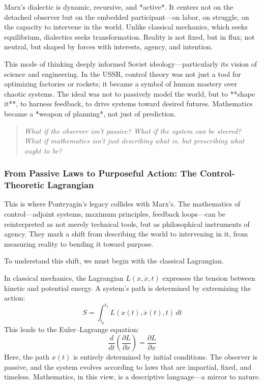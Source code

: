 Marx's dialectic is dynamic, recursive, and *active*. It centers not on the detached observer but on the embedded participant—on labor, on struggle, on the capacity to intervene in the world. Unlike classical mechanics, which seeks equilibrium, dialectics seeks transformation. Reality is not fixed, but in flux; not neutral, but shaped by forces with interests, agency, and intention.

This mode of thinking deeply informed Soviet ideology—particularly its vision of science and engineering. In the USSR, control theory was not just a tool for optimizing factories or rockets; it became a symbol of human mastery over chaotic systems. The ideal was not to passively model the world, but to **shape it**, to harness feedback, to drive systems toward desired futures. Mathematics became a *weapon of planning*, not just of prediction.

\begin{quote}
\emph{What if the observer isn’t passive? What if the system can be steered? What if mathematics isn't just describing what is, but prescribing what ought to be?}
\end{quote}

\subsubsection{From Passive Laws to Purposeful Action: The Control-Theoretic Lagrangian}

This is where Pontryagin’s legacy collides with Marx’s. The mathematics of control—adjoint systems, maximum principles, feedback loops—can be reinterpreted as not merely technical tools, but as philosophical instruments of agency. They mark a shift from describing the world to intervening in it, from measuring reality to bending it toward purpose.

To understand this shift, we must begin with the classical Lagrangian.

In classical mechanics, the Lagrangian \( L(x, \dot{x}, t) \) expresses the tension between kinetic and potential energy. A system’s path is determined by extremizing the action:
\[
S = \int_{t_0}^{t_1} L(x(t), \dot{x}(t), t) \, dt
\]
This leads to the Euler–Lagrange equation:
\[
\frac{d}{dt} \left( \frac{\partial L}{\partial \dot{x}} \right) = \frac{\partial L}{\partial x}
\]
Here, the path \( x(t) \) is entirely determined by initial conditions. The observer is passive, and the system evolves according to laws that are impartial, fixed, and timeless. Mathematics, in this view, is a descriptive language—a mirror to nature.

